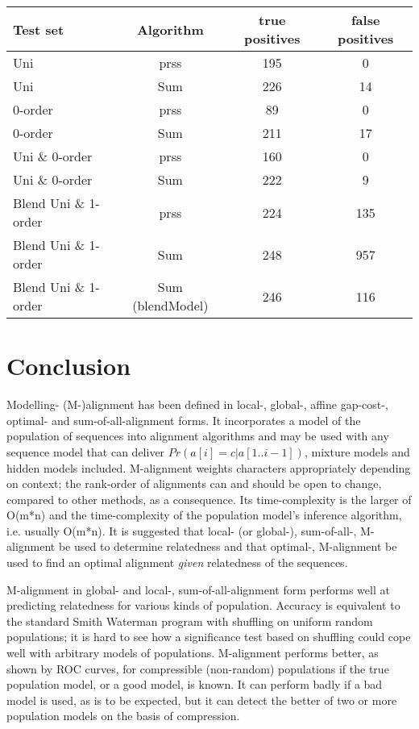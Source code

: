 \documentclass[letterpaper,11pt,oneside]{article}
\begin{document}
\begin{minipage}{\textwidth}
\small
\begin{tabular}{|l|c||c|c|} \hline
Test set & Algorithm & true positives & false positives \\ \hline
Uni &  prss & 195 & 0  \\ 
Uni & Sum & 226 & 14  \\ \hline

0-order & prss & 89 & 0  \\ 
0-order & Sum & 211 & 17  \\ \hline

Uni \& 0-order & prss & 160 & 0  \\ 
Uni \& 0-order & Sum & 222 & 9  \\  \hline

Blend Uni \& 1-order & prss & 224 & 135  \\ 
Blend Uni \& 1-order & Sum & 248 & 957 \\ 
Blend Uni \& 1-order & Sum (blendModel) & 246 & 116 \\ 
\hline \end{tabular}
\end{minipage}




\section{Conclusion}
\label{sec:conc}


Modelling- (M-)alignment has been defined in local-, global-, affine
gap-cost-, optimal- and sum-of-all-alignment forms.  It incorporates a model
of the population of sequences into alignment algorithms and may be used with
any sequence model that can deliver $Pr(a[i]=c|a[1..i-1])$, mixture models and
hidden models included.  M-alignment weights characters appropriately
depending on context; the rank-order of alignments can and should be open to
change, compared to other methods, as a consequence.  Its time-complexity is
the larger of O(m*n) and the time-complexity of the population model's
inference algorithm, i.e. usually O(m*n).  It is suggested that local- (or
global-), sum-of-all-, M-alignment be used to determine relatedness and that
optimal-, M-alignment be used to find an optimal alignment {\em given}
relatedness of the sequences.

M-alignment in global- and local-, sum-of-all-alignment form performs well
at predicting relatedness for various kinds of population.
Accuracy is equivalent to the standard Smith Waterman program with shuffling
on uniform random populations;
it is hard to see how a significance test based on shuffling could
cope well with arbitrary models of populations.
M-alignment performs better, as shown by ROC curves,
for compressible (non-random) populations if the true
population model, or a good model, is known.
It can perform badly if a bad model is used, as is to be expected,
but it can detect the better of two or more population models
on the basis of compression.
\end{document}
